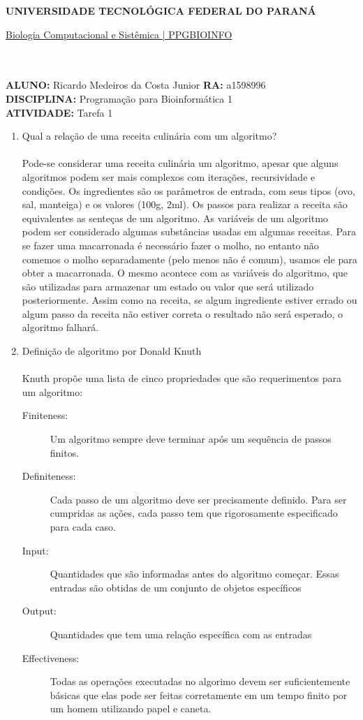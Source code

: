 \documentclass[a4paper, 12pt]{article}
\begin{document}
\textbf{UNIVERSIDADE TECNOLÓGICA FEDERAL DO PARANÁ}\\
\centerline{\underline{Biologia Computacional e Sistêmica | PPGBIOINFO}}\\\\
\textbf{ALUNO:} Ricardo Medeiros da Costa Junior   \textbf{RA:} a1598996 \\
\textbf{DISCIPLINA:} Programação para Bioinformática 1 \\
\textbf{ATIVIDADE:} Tarefa 1 \\
\begin{enumerate} 
\item Qual a relação de uma receita culinária com um algoritmo? \\ \\
Pode-se considerar uma receita culinária um algoritmo, apesar que alguns algoritmos podem ser mais complexos com iterações, recursividade e condições.
Os ingredientes são os parâmetros de entrada, com seus tipos (ovo, sal, manteiga) e os valores (100g, 2ml).
Os passos para realizar a receita são equivalentes as senteças de um algoritmo. As variáveis de um algoritmo podem ser considerado algumas substâncias usadas em algumas receitas. Para se fazer uma macarronada é necessário fazer o molho, no entanto não comemos o molho separadamente (pelo menos não é comum), usamos ele para obter a macarronada. O mesmo acontece com as variáveis do algoritmo, que são utilizadas para armazenar um estado ou valor que será utilizado posteriormente. Assim como na receita, se algum ingrediente estiver errado ou algum passo da receita não estiver correta o resultado não será esperado, o algoritmo falhará. \\
\item Definição de algoritmo por Donald Knuth \\\\
  Knuth propõe uma lista de cinco propriedades que são requerimentos para um algoritmo:
  \begin{description}
  \item[Finiteness:] Um algoritmo sempre deve terminar após um sequência de passos finitos.
  \item[Definiteness:] Cada passo de um algoritmo deve ser precisamente definido. Para ser cumpridas as ações, cada passo tem que rigorosamente especificado para cada caso.
   \item[Input:] Quantidades que são informadas antes do algoritmo começar. Essas entradas são obtidas de um conjunto de objetos específicos
  \item[Output:] Quantidades que tem uma relação específica com as entradas
  \item[Effectiveness:] Todas as operações executadas no algorimo devem ser suficientemente básicas que elas pode ser feitas corretamente em um tempo finito por um homem utilizando papel e caneta.
  \end{description}
  
\end{enumerate}
\end{document}
